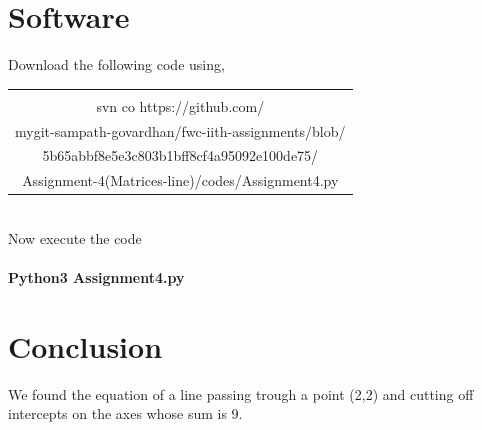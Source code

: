 \documentclass[journal,12pt,twocolumn]{IEEEtran}
\begin{document}
\section{Software}
Download the following code using, \\
\begin{table}[h]
    \centering
    \begin{tabular}{|c|}
    \hline \\
         svn co https://github.com/\\mygit-sampath-govardhan/fwc-iith-assignments/blob/\\5b65abbf8e5e3c803b1bff8cf4a95092e100de75/\\Assignment-4(Matrices-line)/codes/Assignment4.py  \\
   \hline
    \end{tabular}
\end{table}
\\
Now execute the code \\
\\
\textbf{Python3  Assignment4.py}\\
\section{Conclusion}
We found the equation of a line passing trough a point
(2,2) and cutting off intercepts on the axes whose
sum is 9.
\end{document}
